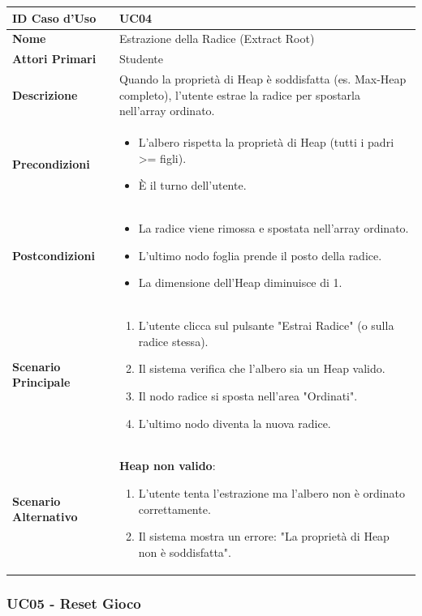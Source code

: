 \documentclass[openany]{theme/uniprthesis}
\begin{document}
\begin{xltabular}{\textwidth}{|l|X|}
\hline
\textbf{ID Caso d'Uso} & UC04 \\
\hline
\textbf{Nome} & Estrazione della Radice (Extract Root) \\
\hline
\textbf{Attori Primari} & Studente \\
\hline
\textbf{Descrizione} & Quando la proprietà di Heap è soddisfatta (es. Max-Heap completo), l'utente estrae la radice per spostarla nell'array ordinato. \\
\hline
\textbf{Precondizioni} & \begin{itemize}
    \item L'albero rispetta la proprietà di Heap (tutti i padri >= figli).
    \item È il turno dell'utente.
\end{itemize} \\
\hline
\textbf{Postcondizioni} & \begin{itemize}
    \item La radice viene rimossa e spostata nell'array ordinato.
    \item L'ultimo nodo foglia prende il posto della radice.
    \item La dimensione dell'Heap diminuisce di 1.
\end{itemize} \\
\hline
\textbf{Scenario Principale} & \begin{enumerate}
    \item L'utente clicca sul pulsante "Estrai Radice" (o sulla radice stessa).
    \item Il sistema verifica che l'albero sia un Heap valido.
    \item Il nodo radice si sposta nell'area "Ordinati".
    \item L'ultimo nodo diventa la nuova radice.
\end{enumerate} \\
\hline
\textbf{Scenario Alternativo} & \textbf{Heap non valido}:
\begin{enumerate}
    \item L'utente tenta l'estrazione ma l'albero non è ordinato correttamente.
    \item Il sistema mostra un errore: "La proprietà di Heap non è soddisfatta".
\end{enumerate} \\
\hline
\end{xltabular}

\subsubsection{UC05 - Reset Gioco}
\end{document}
